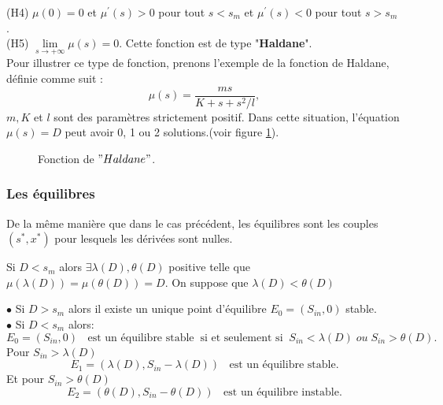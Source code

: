 \documentclass[12pt,a4paper]{report}%
\begin{document}
(H4) $\mu(0) = 0$ et $\mu^{\prime}(s) > 0$ pour tout  $s<s_m$ et $\mu^{\prime}(s) < 0$ pour tout $s > s_m$ .\\
(H5) $\lim\limits_{s\rightarrow +\infty}\mu(s)=0$.
Cette fonction est de type "{\bf Haldane}".\\
Pour illustrer ce type de fonction, prenons l'exemple de la fonction de Haldane, définie comme suit :
$$
\mu(s)=\frac{m s}{K+s+s^2/l},
$$
$m, K$ et $l$ sont des paramètres strictement positif. Dans cette situation, l'équation \( \mu(s) = D \) peut avoir 0, 1 ou 2 solutions.(voir figure \ref{Ghaldane}).
\begin{figure}[htbp]
  \centering
{}
  \caption{Fonction de $" Haldane "$.}
  \label{Ghaldane}
\end{figure}
\subsubsection{Les équilibres }
De la même manière que dans le cas précédent, les équilibres sont les couples \((s^*, x^*)\) pour lesquels les dérivées sont nulles.

Si $D<s_m$ alors $\exists \lambda(D), \theta(D)$ positive telle que $\mu(\lambda(D))=\mu(\theta(D))=D$. On suppose que  $ \lambda(D)<\theta(D)$
\begin{théorème}{}{}
$\bullet$ Si  $D >s_m$ alors il existe un unique point d'équilibre $E_0=(S_{in} , 0)$ stable.\\
$\bullet$ Si $D<s_m$ alors:
$$
E_0=(S_{in}, 0)\;\;\text{ est un équilibre stable}\; \;\text{si et seulement si} \; \;S_{in}<\lambda(D) \; ou \; S_{in}>\theta(D)
.$$
Pour $S_{in}>\lambda(D)$
$$
E_1=(\lambda(D), S_{in}-\lambda(D))\;\;\text{ est un équilibre stable}.
$$
Et pour $S_{in}>\theta(D)$
$$
E_2=(\theta(D), S_{in}-\theta(D))\; \; \text{ est un équilibre instable}.
$$
\end{théorème}
\end{document}
